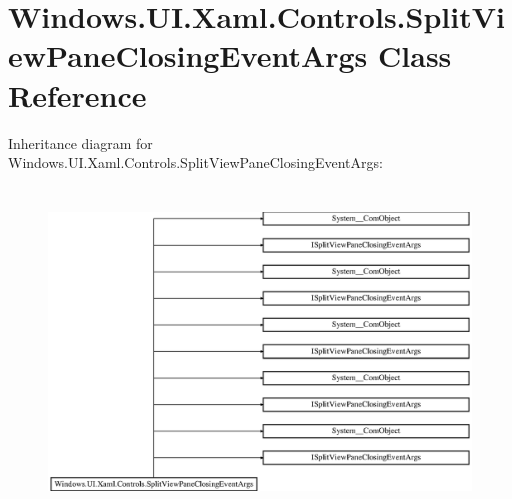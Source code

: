 \hypertarget{class_windows_1_1_u_i_1_1_xaml_1_1_controls_1_1_split_view_pane_closing_event_args}{}\section{Windows.\+U\+I.\+Xaml.\+Controls.\+Split\+View\+Pane\+Closing\+Event\+Args Class Reference}
\label{class_windows_1_1_u_i_1_1_xaml_1_1_controls_1_1_split_view_pane_closing_event_args}
Inheritance diagram for Windows.\+U\+I.\+Xaml.\+Controls.\+Split\+View\+Pane\+Closing\+Event\+Args\+:\begin{figure}[H]
\begin{center}
\leavevmode
\includegraphics[height=8.700564cm]{class_windows_1_1_u_i_1_1_xaml_1_1_controls_1_1_split_view_pane_closing_event_args}
\end{center}
\end{figure}
